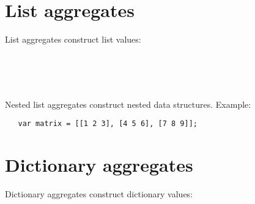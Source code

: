 \section{List aggregates}

List aggregates construct list values:

\begin{grammar}
      \produces \lextoken{\leftbracketSY} \lextoken{\rightbracketSY} \\
      \produces \lextoken{\leftbracketSY}
          \lextoken{\rightbracketSY} \\
      \produces {} \\
      \produces {} \lextoken{,}
\end{grammar}

\noindent
Nested list aggregates construct nested data structures. Example:

\begin{lstlisting}
   var matrix = [[1 2 3], [4 5 6], [7 8 9]];
\end{lstlisting}

\section{Dictionary aggregates}

Dictionary aggregates construct dictionary values:

\begin{grammar}
      \produces \lextoken{\{} \lextoken{\}} \\
      \produces \lextoken{\{}  \lextoken{\}} \\
      \produces \lextoken{\{} 
         \lextoken{,} \lextoken{\}} \\
      \produces {} \\
      \produces {} \lextoken{,}
          \\
      \produces {} \lextoken{->}
\end{grammar}


